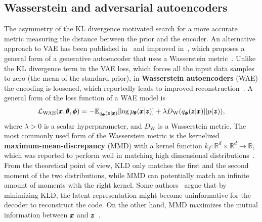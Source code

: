 \subsection{Wasserstein and adversarial autoencoders}
The asymmetry of the KL divergence motivated search for a more accurate metric measuring the distance between the prior and the encoder. An alternative approach to VAE has been published in~\cite{mescheder2017adversarial} and improved in~\cite{tolstikhin2017wasserstein}, which proposes a general form of a generative autoencoder that uses a Wasserstein metric~\cite{givens1984class}. Unlike the KL divergence term in the VAE loss, which forces all the input data samples to zero (the mean of the standard prior), in \textbf{Wasserstein autoencoders} (WAE) the encoding is loosened, which reportedly leads to improved reconstruction~\cite{tolstikhin2017wasserstein}. A general form of the loss function of a WAE model is
\begin{equation} \label{eq:general_wae_loss}
    \mathcal{L}_{\text{WAE}} (\vc{x}, \vc{\theta}, \vc{\phi}) = - \mathbb{E}_{q_{\vc{\phi}}(\vc{z}|\vc{x})} \left[ \log p_{\vc{\theta}}(\vc{x}|\vc{z}) \right] + \lambda D_{\text{W}} \left( q_{\vc{\phi}}(\vc{z}|\vc{x}) || p(\vc{z}) \right),
\end{equation}
where $\lambda >0$  is a scalar hyperparameter, and $D_{\text{W}}$ is a Wasserstein metric. The most commonly used form of the Wasserstein metric is the kernelized \textbf{maximum-mean-discrepancy} (MMD) with a kernel function $k_f:\mathbb{R}^d \times \mathbb{R}^d \rightarrow \mathbb{R}$, which was reported to perform well in matching high dimensional distributions~\cite{zhao2017infovae}. From the theoretical point of view, KLD only matches the first and the second moment of the two distributions, while MMD can potentially match an infinite amount of moments with the right kernel. Some authors~\cite{tolstikhin2017wasserstein} argue that by minimizing KLD, the latent representation might become uninformative for the decoder to reconstruct the code. On the other hand, MMD maximizes the mutual information between $\pmb{{x}}$  and $\pmb{{z}}$~\cite{zhao2017infovae}.

